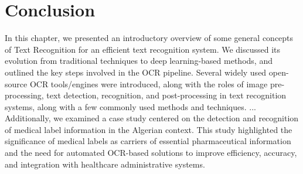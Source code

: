 \section{Conclusion}
In this chapter, we presented an introductory overview of some general concepts of Text Recognition for an efficient text recognition system. We discussed its evolution from traditional techniques to deep learning-based methods, and outlined the key steps involved in the OCR pipeline. Several widely used open-source OCR tools/engines were introduced, along with the roles of image pre-processing, text detection, recognition, and post-processing in text recognition systems, along with a few commonly used methods and techniques.
...
Additionally, we examined a case study centered on the detection and recognition of medical label information in the Algerian context. This study highlighted the significance of medical labels as carriers of essential pharmaceutical information and the need for automated OCR-based solutions to improve efficiency, accuracy, and integration with healthcare administrative systems.







